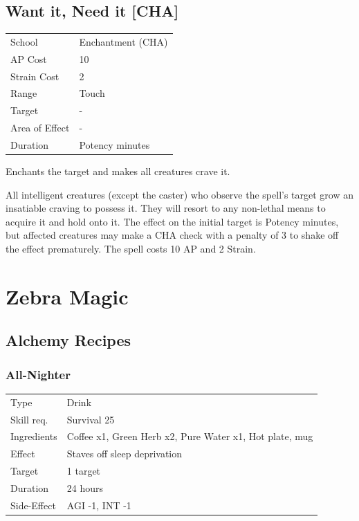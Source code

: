 \documentclass[11pt,a4paper,twocolumn]{book}
\begin{document}
\section*{Want it, Need it [CHA]}
{
	\begin{tabu} to 75mm{| X[l,4] | X[l,7] |}
		\hline
		School 			& Enchantment (CHA) 		\\
        AP Cost	      	& 10 						\\
        Strain Cost     & 2 						\\
        Range     		& Touch 					\\
        Target      	& -							\\
        Area of Effect  & - 	 					\\
        Duration     	& Potency minutes			\\ \hline
	\end{tabu}
		
}

\medskip

Enchants the target and makes all creatures crave it.

All intelligent creatures (except the caster) who observe the spell's target grow an insatiable craving to possess it. They will resort to any non-lethal means to acquire it and hold onto it. The effect on the initial target is Potency minutes, but affected creatures may make a CHA check with a penalty of 3 to shake off the effect prematurely. The spell costs 10 AP and 2 Strain.

\chapter{Zebra Magic}

\section*{Alchemy Recipes}


\subsection*{All-Nighter}
{
	\begin{tabu} to 75mm{| X[l,4] | X[l,8] |}
		\hline
		Type 			& Drink 													\\
        Skill req.	    & Survival 25 												\\
        Ingredients     & Coffee x1, Green Herb x2, Pure Water x1, Hot plate, mug	\\
        Effect     		& Staves off sleep deprivation 								\\
        Target      	& 1 target													\\
        Duration  		& 24 hours	 												\\
        Side-Effect     & AGI -1, INT -1											\\ \hline
	\end{tabu}
		
}
\medskip
\end{document}
